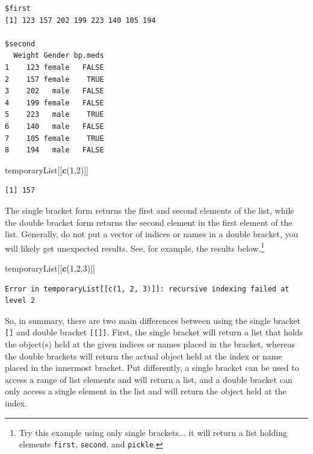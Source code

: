 \documentclass[
]{krantz}
\makeatletter
\newenvironment{Shaded}{\begin{snugshade}}{\end{snugshade}}
\newcommand{\DecValTok}[1]{\textcolor[rgb]{0.06,0.06,0.06}{#1}}
\newcommand{\KeywordTok}[1]{\textcolor[rgb]{0.27,0.27,0.27}{\textbf{#1}}}
\newcommand{\NormalTok}[1]{#1}
\newenvironment{kframe}{%
\medskip{}
\setlength{\fboxsep}{.8em}
 \def\at@end@of@kframe{}%
 \ifinner\ifhmode%
  \def\at@end@of@kframe{\end{minipage}}%
  \begin{minipage}{\columnwidth}%
 \fi\fi%
 \def\FrameCommand##1{\hskip\@totalleftmargin \hskip-\fboxsep
 \colorbox{shadecolor}{##1}\hskip-\fboxsep
     \hskip-\linewidth \hskip-\@totalleftmargin \hskip\columnwidth}%
 \MakeFramed {\advance\hsize-\width
   \@totalleftmargin\z@ \linewidth\hsize
   \@setminipage}}%
 {\par\unskip\endMakeFramed%
 \at@end@of@kframe}
\renewenvironment{Shaded}{\begin{kframe}}{\end{kframe}}
\makeatother
\begin{document}
\begin{verbatim}
$first
[1] 123 157 202 199 223 140 105 194

$second
  Weight Gender bp.meds
1    123 female   FALSE
2    157 female    TRUE
3    202   male   FALSE
4    199 female   FALSE
5    223   male    TRUE
6    140   male   FALSE
7    105 female    TRUE
8    194   male   FALSE
\end{verbatim}

\begin{Shaded}
\begin{Highlighting}[]
\NormalTok{temporaryList[[}\KeywordTok{c}\NormalTok{(}\DecValTok{1}\NormalTok{,}\DecValTok{2}\NormalTok{)]]}
\end{Highlighting}
\end{Shaded}

\begin{verbatim}
[1] 157
\end{verbatim}

The single bracket form returns the first and second elements of the list, while the double bracket form returns the second element in the first element of the list. Generally, do not put a vector of indices or names in a double bracket, you will likely get unexpected results. See, for example, the results below.\footnote{Try this example using only single brackets\(\ldots\) it will return a list holding elements \texttt{first}, \texttt{second}, and \texttt{pickle}.}

\begin{Shaded}
\begin{Highlighting}[]
\NormalTok{temporaryList[[}\KeywordTok{c}\NormalTok{(}\DecValTok{1}\NormalTok{,}\DecValTok{2}\NormalTok{,}\DecValTok{3}\NormalTok{)]]}
\end{Highlighting}
\end{Shaded}

\begin{verbatim}
Error in temporaryList[[c(1, 2, 3)]]: recursive indexing failed at level 2
\end{verbatim}

So, in summary, there are two main differences between using the single bracket \texttt{{[}{]}} and double bracket \texttt{{[}{[}{]}{]}}. First, the single bracket will return a list that holds the object(s) held at the given indices or names placed in the bracket, whereas the double brackets will return the actual object held at the index or name placed in the innermost bracket. Put differently, a single bracket can be used to access a range of list elements and will return a list, and a double bracket can only access a single element in the list and will return the object held at the index.
\end{document}
